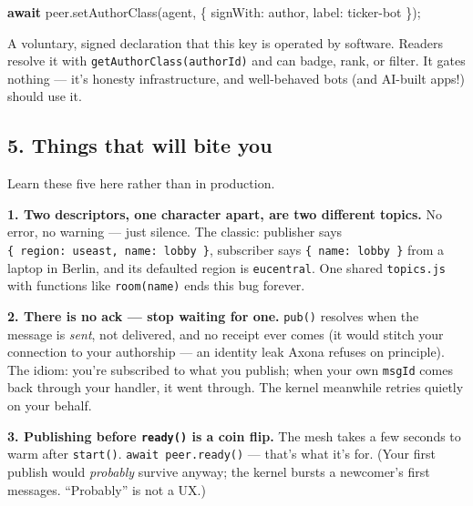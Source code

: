 \documentclass[
  nobib]{tufte-handout}
\newenvironment{Shaded}{}{}
\newcommand{\ControlFlowTok}[1]{\textcolor[rgb]{0.00,0.44,0.13}{\textbf{#1}}}
\newcommand{\DataTypeTok}[1]{\textcolor[rgb]{0.56,0.13,0.00}{#1}}
\newcommand{\FunctionTok}[1]{\textcolor[rgb]{0.02,0.16,0.49}{#1}}
\newcommand{\NormalTok}[1]{#1}
\newcommand{\OperatorTok}[1]{\textcolor[rgb]{0.40,0.40,0.40}{#1}}
\newcommand{\StringTok}[1]{\textcolor[rgb]{0.25,0.44,0.63}{#1}}
\begin{document}
\begin{Shaded}
\begin{Highlighting}[]
\ControlFlowTok{await}\NormalTok{ peer}\OperatorTok{.}\FunctionTok{setAuthorClass}\NormalTok{(}\StringTok{\textquotesingle{}agent\textquotesingle{}}\OperatorTok{,}\NormalTok{ \{ }\DataTypeTok{signWith}\OperatorTok{:}\NormalTok{ author}\OperatorTok{,} \DataTypeTok{label}\OperatorTok{:} \StringTok{\textquotesingle{}ticker{-}bot\textquotesingle{}}\NormalTok{ \})}\OperatorTok{;}
\end{Highlighting}
\end{Shaded}

A voluntary, signed declaration that this key is operated by software.
Readers resolve it with \texttt{getAuthorClass(authorId)} and can badge,
rank, or filter. It gates nothing --- it's honesty infrastructure, and
well-behaved bots (and AI-built apps!) should use it.

\subsection{5. Things that will bite
you}\label{things-that-will-bite-you}

Learn these five here rather than in production.

\textbf{1. Two descriptors, one character apart, are two different
topics.} No error, no warning --- just silence. The classic: publisher
says
\texttt{\{\ region:\ \textquotesingle{}useast\textquotesingle{},\ name:\ \textquotesingle{}lobby\textquotesingle{}\ \}},
subscriber says
\texttt{\{\ name:\ \textquotesingle{}lobby\textquotesingle{}\ \}} from a
laptop in Berlin, and its defaulted region is \texttt{eucentral}. One
shared \texttt{topics.js} with functions like \texttt{room(name)} ends
this bug forever.

\textbf{2. There is no ack --- stop waiting for one.} \texttt{pub()}
resolves when the message is \emph{sent}, not delivered, and no receipt
ever comes (it would stitch your connection to your authorship --- an
identity leak Axona refuses on principle). The idiom: you're subscribed
to what you publish; when your own \texttt{msgId} comes back through
your handler, it went through. The kernel meanwhile retries quietly on
your behalf.

\textbf{3. Publishing before \texttt{ready()} is a coin flip.} The mesh
takes a few seconds to warm after \texttt{start()}.
\texttt{await\ peer.ready()} --- that's what it's for. (Your first
publish would \emph{probably} survive anyway; the kernel bursts a
newcomer's first messages. ``Probably'' is not a UX.)
\end{document}
